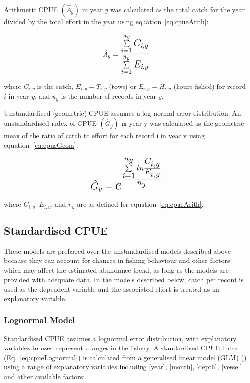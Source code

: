 Arithmetic CPUE $\left(\hat{A}_y\right)$ in year $y$ was calculated as the total catch for the year divided by the total effort in the year using equation~\ref{eq:cpueArith}:

\begin{align} \label{eq:cpueArith}
\hat{A}_y=\bM{\frac{\sum\limits_{i=1}^{n_y}{C_{i,y}}}{\sum\limits_{i=1}^{n_y}{E_{i,y}}}}
\end{align}
\begin{addmargin}[3em]{1em}
where $C_{i,y}$ is the catch, $E_{i,y}=T_{i,y}$ (tows) or $E_{i,y}=H_{i,y}$ (hours fished) for record $i$ in year $y$, and $n_y$ is the number of records in year $y$.
\end{addmargin}

Unstandardised (geometric) CPUE assumes a log-normal error distribution. An unstandardised index of CPUE $\left(\hat{G}_y\right)$ in year y was calculated as the geometric mean of the ratio of catch to effort for each record i in year y using  equation~\ref{eq:cpueGeom}:

\begin{align} \label{eq:cpueGeom}
\bM{\hat{G}_y=\bM{e^{\frac{\sum\limits_{i=1}^{n_y}{ln{\frac{C_{i,y}}{E_{i,y}}}}}{n_y}}}}
\end{align}
\begin{addmargin}[3em]{1em}
where $C_{i,y}$, $E_{i,y}$, and $n_y$ are as defined for equation~\ref{eq:cpueArith}.
\end{addmargin}

\subsection{Standardised CPUE}

These models are preferred over the unstandardised models described above because they can account for changes in fishing behaviour and other factors which may affect the estimated abundance trend, as long as the models are provided with adequate data. In the models described below, catch per record is used as the dependent variable and the associated effort is treated as an explanatory variable.

\subsubsection{Lognormal Model}

Standardised CPUE assumes a lognormal error distribution, with explanatory variables to used represent changes in the fishery. A standardised CPUE index (Eq.~\ref{eq:cpueLognormal}) is calculated from a generalised linear model (GLM) (\citet{qd99}) using a range of explanatory variables including [year], [month], [depth], [vessel] and other available factors:

